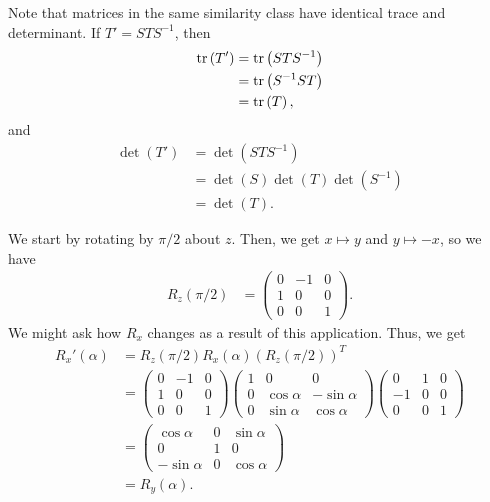 \documentclass[10pt]{mypackage}
\begin{document}
Note that matrices in the same similarity class have identical trace and determinant. If $T' = STS^{-1}$, then
\begin{align*}
  \tr\left(T'\right) &= \tr\left(STS^{-1}\right)\\
                     &= \tr\left(S^{-1}ST\right)\\
                     &= \tr\left(T\right),
\end{align*}
and
\begin{align*}
  \det\left(T'\right) &= \det\left(STS^{-1}\right)\\
                      &= \det\left(S\right)\det\left(T\right)\det\left(S^{-1}\right)\\
                      &= \det\left(T\right).
\end{align*}
\begin{example}
  We start by rotating by $\pi/2$ about $z$. Then, we get $x\mapsto y$  and $y\mapsto -x$, so we have
  \begin{align*}
    R_z\left(\pi/2\right) &= \begin{pmatrix}0 & -1 & 0 \\ 1 & 0 & 0 \\ 0 & 0 & 1\end{pmatrix}.
  \end{align*}
  We might ask how $R_x$ changes as a result of this application. Thus, we get
  \begin{align*}
    R_x'\left(\alpha\right) &= R_z\left(\pi/2\right)R_x\left(\alpha\right)\left(R_z\left(\pi/2\right)\right)^{T}\\
                            &= \begin{pmatrix}0 & -1 & 0 \\ 1 & 0 & 0 \\ 0 & 0 & 1\end{pmatrix} \begin{pmatrix}1 & 0 & 0\\ 0 & \cos\alpha & -\sin\alpha \\ 0 & \sin\alpha & \cos\alpha\end{pmatrix} \begin{pmatrix}0 & 1 & 0 \\ -1 & 0 & 0 \\ 0 & 0 & 1\end{pmatrix}\\
                            &= \begin{pmatrix}\cos\alpha & 0 & \sin\alpha \\ 0 & 1 & 0 \\ -\sin\alpha & 0 & \cos\alpha\end{pmatrix}\\
                            &= R_y\left(\alpha\right).
  \end{align*}
\end{example}
\end{document}
